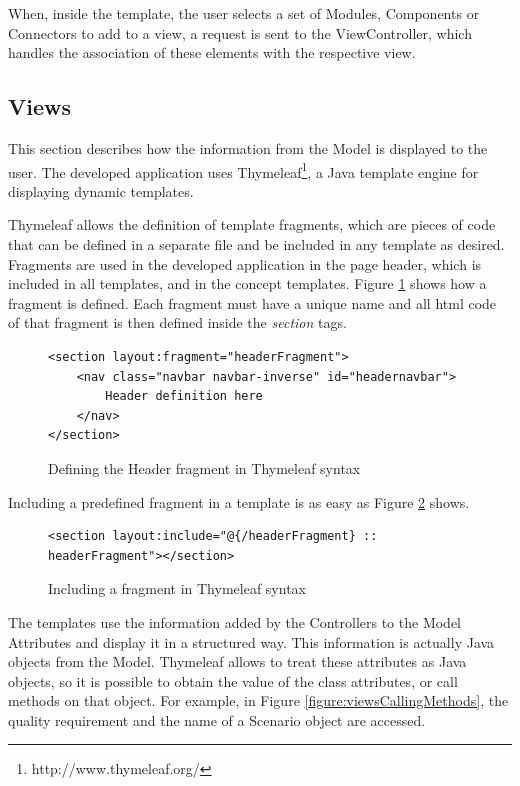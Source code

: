 \documentclass{llncs}
\begin{document}
When, inside the template, the user selects a set of Modules, Components or Connectors to add to a view, a request is sent to the ViewController, which handles the association of these elements with the respective view.

\subsection{Views}
\label{section:Views}
This section describes how the information from the Model is displayed to the user. The developed application uses Thymeleaf\footnote{http://www.thymeleaf.org/}, a Java template engine for displaying dynamic templates.

Thymeleaf allows the definition of template fragments, which are pieces of code that can be defined in a separate file and be included in any template as desired. Fragments are used in the developed application in the page header, which is included in all templates, and in the concept templates. Figure \ref{figure:viewsHeaderFragment} shows how a fragment is defined. Each fragment must have a unique name and all html code of that fragment is then defined inside the \textit{section} tags.
\begin{figure}
\lstset{style=customhtml}
\begin{lstlisting}
<section layout:fragment="headerFragment">
	<nav class="navbar navbar-inverse" id="headernavbar">
		Header definition here	
	</nav>
</section>
\end{lstlisting}
\caption{Defining the Header fragment in Thymeleaf syntax}
\label{figure:viewsHeaderFragment}
\end{figure}

Including a predefined fragment in a template is as easy as Figure \ref{figure:viewsIncludeFragment} shows.
\begin{figure}
\lstset{style=customhtml}
\begin{lstlisting}
<section layout:include="@{/headerFragment} :: headerFragment"></section>
\end{lstlisting}
\caption{Including a fragment in Thymeleaf syntax}
\label{figure:viewsIncludeFragment}
\end{figure}

The templates use the information added by the Controllers to the Model Attributes and display it in a structured way. This information is actually Java objects from the Model. Thymeleaf allows to treat these attributes as Java objects, so it is possible to obtain the value of the class attributes, or call methods on that object. For example, in Figure \ref{figure:viewsCallingMethods}, the quality requirement and the name of a Scenario object are accessed.
\end{document}
